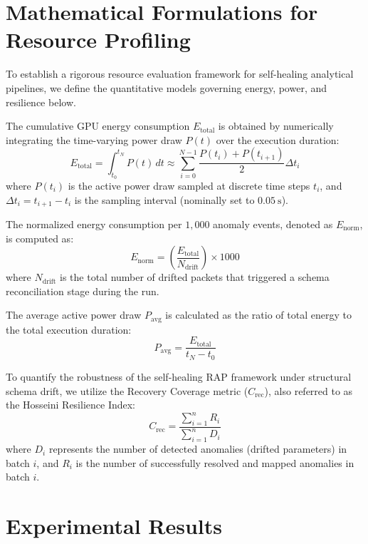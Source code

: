 \documentclass[11pt]{article}
\begin{document}
\section{Mathematical Formulations for Resource Profiling}
To establish a rigorous resource evaluation framework for self-healing analytical pipelines, we define the quantitative models governing energy, power, and resilience below.

The cumulative GPU energy consumption $E_{\text{total}}$ is obtained by numerically integrating the time-varying power draw $P(t)$ over the execution duration:
\begin{equation}
E_{\text{total}} = \int_{t_0}^{t_N} P(t) \, dt \approx \sum_{i=0}^{N-1} \frac{P(t_i) + P(t_{i+1})}{2} \Delta t_i
\end{equation}
where $P(t_i)$ is the active power draw sampled at discrete time steps $t_i$, and $\Delta t_i = t_{i+1} - t_i$ is the sampling interval (nominally set to $\qty{0.05}{\second}$).

The normalized energy consumption per $1,000$ anomaly events, denoted as $E_{\text{norm}}$, is computed as:
\begin{equation}
E_{\text{norm}} = \left( \frac{E_{\text{total}}}{N_{\text{drift}}} \right) \times 1000
\end{equation}
where $N_{\text{drift}}$ is the total number of drifted packets that triggered a schema reconciliation stage during the run.

The average active power draw $P_{\text{avg}}$ is calculated as the ratio of total energy to the total execution duration:
\begin{equation}
P_{\text{avg}} = \frac{E_{\text{total}}}{t_N - t_0}
\end{equation}

To quantify the robustness of the self-healing RAP framework under structural schema drift, we utilize the Recovery Coverage metric ($C_{\text{rec}}$), also referred to as the Hosseini Resilience Index:
\begin{equation}
C_{\text{rec}} = \frac{\sum_{i=1}^{n} R_i}{\sum_{i=1}^{n} D_i}
\end{equation}
where $D_i$ represents the number of detected anomalies (drifted parameters) in batch $i$, and $R_i$ is the number of successfully resolved and mapped anomalies in batch $i$.

\section{Experimental Results}
\end{document}
